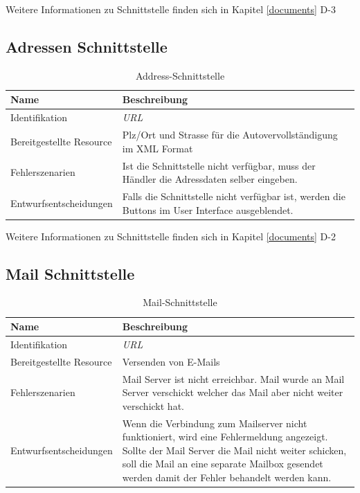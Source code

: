 Weitere Informationen zu Schnittstelle finden sich in Kapitel \ref{documents} D-3

\subsection{Adressen Schnittstelle}

\begin{table}[H]
	\centering
	\caption{Address-Schnittstelle}
	\begin{tabular}{  | p{4cm} | p{11cm} |}
		\toprule
		{\textbf{Name}} & {\textbf{Beschreibung}} \\
		\midrule
		Identifikation & \textit{\gls{URL}} \\ \hline
		Bereitgestellte Resource & Plz/Ort und Strasse für die Autovervollständigung im XML Format \\ \hline
		Fehlerszenarien & Ist die Schnittstelle nicht verfügbar, muss der Händler die Adressdaten selber eingeben.\\ \hline
		Entwurfsentscheidungen & Falls die Schnittstelle nicht verfügbar ist, werden die Buttons im User Interface ausgeblendet.\\
		\bottomrule
	\end{tabular}
\end{table}

Weitere Informationen zu Schnittstelle finden sich in Kapitel \ref{documents} D-2

\subsection{Mail Schnittstelle}

\begin{table}[H]
	\centering
	\caption{Mail-Schnittstelle}
	\begin{tabular}{ | p{4cm} | p{11cm} |}
		\toprule
		{\textbf{Name}} & {\textbf{Beschreibung}} \\
		\midrule
		Identifikation & \textit{\gls{URL}} \\ \hline
		Bereitgestellte Resource & Versenden von E-Mails\\ \hline
		Fehlerszenarien & Mail Server ist nicht erreichbar. Mail wurde an Mail Server verschickt welcher das Mail aber nicht weiter verschickt hat.\\ \hline
		Entwurfsentscheidungen & Wenn die Verbindung zum Mailserver nicht funktioniert, wird eine Fehlermeldung angezeigt. Sollte der Mail Server die Mail nicht weiter schicken, soll die Mail an eine separate Mailbox gesendet werden damit der Fehler behandelt werden kann.\\
		\bottomrule
	\end{tabular}
\end{table}

